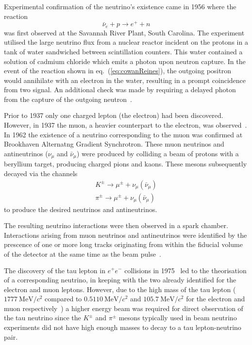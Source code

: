 Experimental confirmation of the neutrino's existence came in 1956 where the reaction
\begin{equation}
  \bar{\nu}_{e} + p \rightarrow e^{+} + n
  \label{eq:cowanReines}
\end{equation}
was first observed at the Savannah River Plant, South Carolina. The experiment utilised the large neutrino flux from a nuclear reactor incident on the protons in a tank of water sandwiched between scintillation counters.
This water contained a solution of cadmium chloride which emits a photon upon neutron capture.
In the event of the reaction shown in eq.~(\ref{eq:cowanReines}), the outgoing positron would annihilate with an electron in the water, resulting in a prompt coincidence from two signal.
An additional check was made by requiring a delayed photon from the capture of the outgoing neutron~\cite{cowanReines}.

Prior to 1937 only one charged lepton (the electron) had been discovered.
However, in 1937 the muon, a heavier counterpart to the electron, was observed~\cite{muonDiscovery}.
In 1962 the existence of a neutrino corresponding to the muon was confirmed at Brookhaven Alternatng Gradient Synchrotron.
These muon neutrinos and antineutrinos ($\nu_{\mu}$ and $\bar{\nu}_{\mu}$) were produced by colliding a beam of protons with a beryllium target, producing charged pions and kaons.
These mesons subsequently decayed via the channels
\begin{align}
    K^{\pm} \rightarrow \mu^{\pm} + \nu_{\mu}(\bar{\nu}_{\mu}) \\
    \pi^{\pm} \rightarrow \mu^{\pm} + \nu_{\mu}(\bar{\nu}_{\mu})
\end{align}
to produce the desired neutrinos and antineutrinos.

The resulting neutrino interactions were then observed in a spark chamber.
Interactions arising from muon neutrinos and antineutrinos were identified by the prescence of one or more long tracks originating from within the fiducial volume of the detector at the same time as the beam pulse~\cite{numuDiscovery}.   


The discovery of the tau lepton in $e^{+}e^{-}$ collisions in 1975~\cite{tauLepton} led to the theorisation of a corresponding neutrino, in keeping with the two already identified for the electron and muon leptons.
However, due to the high mass of the tau lepton ($1777~\text{MeV}/c^{2}$ compared to $0.5110~\text{MeV}/c^{2}$ and $105.7~\text{MeV}/c^{2}$ for the electron and muon respectively~\cite{pdg2018}) a higher energy beam was required for direct observation of the tau neutrino since the $K^{\pm}$ and $\pi^{\pm}$ mesons typically used in beam neutrino experiments did not have high enough masses to decay to a tau lepton-neutrino pair.

